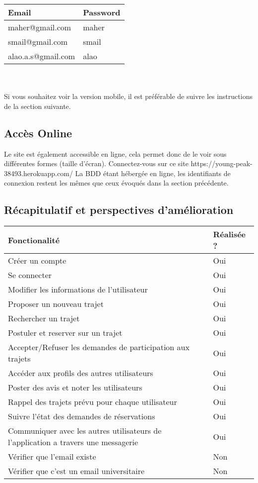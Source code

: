 \documentclass{article}
\begin{document}
\begin{tabular}{ | l | l | }
 \hline
 Email & Password \\ 
  \hline
  maher@gmail.com & maher \\ 
  \hline
  smail@gmail.com & smail  \\  
  \hline
 alao.a.s@gmail.com & alao \\
  \hline
\end{tabular} \\ \\
Si vous souhaitez voir la version mobile, il est préférable de suivre les instructions de la section suivante.

\subsection{Accès Online}
Le site est également accessible en ligne, cela permet donc de le voir sous différentes formes (taille d’écran).  
Connectez-vous sur ce site https://young-peak-38493.herokuapp.com/
La BDD étant hébergée en ligne, les identifiants de connexion restent les mêmes que ceux évoqués dans la section précédente.

\subsection{Récapitulatif et perspectives d'amélioration}
\begin{tabular}{ | l | l | }
\hline
Fonctionalité & Réalisée ? \\
\hline
Créer un compte &  Oui  \\ \hline
Se connecter & Oui   \\ \hline
Modifier les informations de l'utilisateur &   Oui  \\ \hline
Proposer un nouveau trajet &  Oui  \\ \hline
Rechercher un trajet &   Oui \\ \hline
Postuler et reserver sur un trajet & Oui   \\ \hline
Accepter/Refuser les demandes de participation aux trajets &  Oui  \\ \hline
Accéder aux profils des autres utilisateurs &  Oui  \\ \hline
Poster des avis et noter les utilisateurs &   Oui  \\ \hline
Rappel des trajets prévu pour chaque utilisateur &  Oui  \\ \hline
Suivre l'état des demandes de réservations &  Oui  \\ \hline
Communiquer avec les autres utilisateurs de l'application a travers une messagerie &  Oui  \\ \hline
Vérifier que l'email existe & Non \\ \hline
Vérifier que c'est un email universitaire & Non \\ \hline 

\end{tabular}
\end{document}
